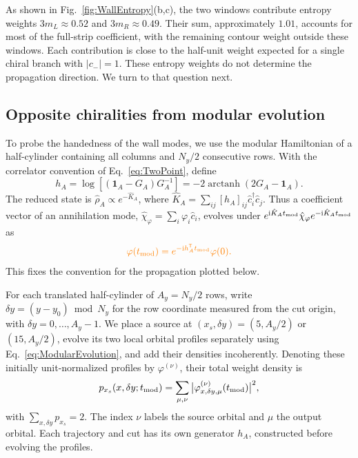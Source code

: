 \documentclass[aps,prb,10pt,twocolumn,superscriptaddress,longbibliography,floatfix]{revtex4-2}
\DeclareMathOperator\arctanh{arctanh}
\newcommand{\ii}{\mathrm{i}}
\newcommand{\Id}{\mathbf{1}}
\newcommand{\newtext}[1]{{\color{blue}#1}}
\newcommand{\claudeadd}[1]{{\color{orange}#1}}
\begin{document}
\newtext{As shown in Fig.~\ref{fig:WallEntropy}(b,c), the two windows contribute entropy weights $3m_L\approx0.52$ and $3m_R\approx0.49$. Their sum, approximately $1.01$, accounts for most of the full-strip coefficient, with the remaining contour weight outside these windows. Each contribution is close to the half-unit weight expected for a single chiral branch with $|c_-|=1$.  These entropy weights do not determine the propagation direction. We turn to that question next.}

{\color{blue}
\subsection{Opposite chiralities from modular evolution}
\label{sec:ModularEvolution}

To probe the handedness of the wall modes, we use the modular Hamiltonian of a half-cylinder containing all columns and $N_y/2$ consecutive rows. With the correlator convention of Eq.~\eqref{eq:TwoPoint}, define
\begin{equation}
 h_A=\log[(\Id_A-G_A)G_A^{-1}]=-2\arctanh(2G_A-\Id_A).
 \label{eq:ModularHamiltonian}
\end{equation}
The reduced state is $\hat\rho_A\propto e^{-\hat K_A}$, where \claudeadd{$\hat K_A=\sum_{ij}[h_A]_{ij}\hat c_i^\dagger\hat c_j$.} Thus a coefficient vector of an annihilation mode, $\hat\chi_\varphi=\sum_i\varphi_i\hat c_i$, evolves under $e^{\ii\hat K_A t_{\rm mod}}\hat\chi_\varphi e^{-\ii\hat K_A t_{\rm mod}}$ as
\begin{equation}
 \claudeadd{\varphi(t_{\rm mod})=e^{-\ii h_A^{\mathsf T} t_{\rm mod}}\varphi(0).}
 \label{eq:ModularEvolution}
\end{equation}
This fixes the convention for the propagation plotted below.

For each translated half-cylinder of $A_y=N_y/2$ rows, write $\delta y=(y-y_0)\bmod N_y$ for the row coordinate measured from the cut origin, with $\delta y=0,\ldots,A_y-1$. We place a source at $(x_s,\delta y)=(5,A_y/2)$ or $(15,A_y/2)$, evolve its two local orbital profiles separately using Eq.~\eqref{eq:ModularEvolution}, and add their densities incoherently. Denoting these initially unit-normalized profiles by $\varphi^{(\nu)}$, their total weight density is
\begin{equation}
 p_{x_s}(x,\delta y;t_{\rm mod})=
 \sum_{\mu,\nu}\big|\varphi^{(\nu)}_{x,\delta y,\mu}(t_{\rm mod})\big|^2,
 \label{eq:ModularPacketDensity}
\end{equation}
with $\sum_{x,\delta y}p_{x_s}=2$. The index $\nu$ labels the source orbital and $\mu$ the output orbital. Each trajectory and cut has its own generator $h_A$, constructed before evolving the profiles.

}
\end{document}
